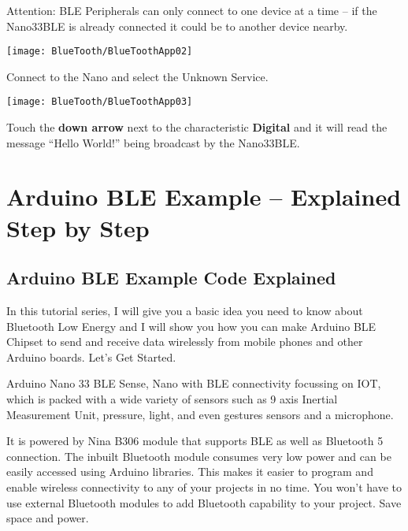 Attention: BLE Peripherals can only connect to one device at a time -- if the Nano33BLE is already connected it could be to another device nearby.

\begin{center}
  \texttt{[image: BlueTooth/BlueToothApp02]}
\end{center}

\medskip

Connect to the Nano and select the Unknown Service.

\begin{center}
  \texttt{[image: BlueTooth/BlueToothApp03]}
\end{center}

\medskip

Touch the \textbf{down arrow} next to the characteristic \textbf{Digital}  and it will read the message ``Hello World!'' being broadcast by the Nano33BLE.


\section{Arduino BLE Example -- Explained Step by Step}


\subsection{Arduino BLE Example Code Explained}

In this tutorial series, I will give you a basic idea you need to know about Bluetooth Low Energy and I will show you how you can make Arduino BLE Chipset to send and receive data wirelessly from mobile phones and other Arduino boards. Let's Get Started.


Arduino Nano 33 BLE Sense, Nano with BLE connectivity focussing on IOT, which is packed with a wide variety of sensors such as 9 axis Inertial Measurement Unit, pressure, light, and even gestures sensors and a microphone.

 It is powered by Nina B306 module that supports BLE as well as Bluetooth 5 connection. The inbuilt Bluetooth module consumes very low power and can be easily accessed using Arduino libraries. This makes it easier to program and enable wireless connectivity to any of your projects in no time. You won’t have to use external Bluetooth modules to add Bluetooth capability to your project. Save space and power.
 
